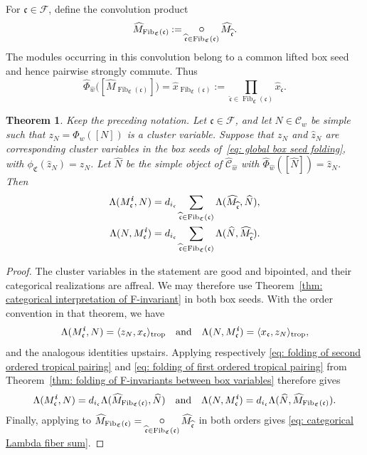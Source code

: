 \documentclass[12pt, leqno]{amsart}
\numberwithin{equation}{section}
\theoremstyle{plain}
\newtheorem{theorem}[lemma]{Theorem}
\theoremstyle{definition}
\newcommand{\seteq}{\mathbin{:=}}
\newcommand{\conv}{\mathop{\mathbin{\mbox{\large $\circ$}}}}
\newcommand{\trop}{{\rm trop}}
\newcommand{\ii}{ \textbf{\textit{i}}}
\newcommand{\Fib}{\operatorname{Fib}}
\newcommand{\hM}{\widehat{M}}
\newcommand{\hN}{\widehat{N}}
\newcommand{\hw}{\widehat{w}}
\newcommand{\hx}{\widehat{x}}
\newcommand{\hz}{\widehat{z}}
\newcommand{\frakC}{\mathfrak{C}}
\newcommand{\frakc}{\mathfrak{c}}
\newcommand{\hfrakc}{\widehat{\frakc}}
\newcommand{\calF}{\mathcal{F}}
\newcommand{\scrC}{\mathscr{C}}
\newcommand{\qtq}[1][{and}]{\quad\text{{#1}}\quad}
\begin{document}
For \(\frakc\in\calF\),   define the convolution product 
\[
\hM_{\Fib_{\frakC}(\frakc)} \seteq \mathop{\conv}_{\hfrakc\in\Fib_{\frakC}(\frakc)} \hM_{\hfrakc}.
\]
The modules occurring in this convolution belong to a common lifted
box seed and hence pairwise strongly commute. 
Thus 
\[
\widehat\Phi_{\hw} \bigl([\hM_{\Fib_{\frakC}(\frakc)}]\bigr) = \hx_{\Fib_{\frakC}(\frakc)} \seteq
\prod_{\hfrakc\in\Fib_{\frakC}(\frakc)} \hx_{\hfrakc}.
\]

\begin{theorem}\label{thm: categorical folding of directional Lambda invariants}
Keep the preceding notation.  Let \(\frakc\in\calF\), and let
\(N\in\scrC_w\) be simple such that \(z_N=\Phi_w([N])\) is a
cluster variable.   Suppose that \(z_N\) and \(\hz_N\) are corresponding cluster variables
in the box seeds of~\eqref{eq: global box seed folding}, with
\(\phi_{\frakC}(\hz_N)=z_N\).  Let \(\hN\) be the simple object of
\(\widehat{\scrC}_{\hw}\) with
\(\widehat\Phi_{\hw}([\hN])=\hz_N\). Then
\begin{subequations} \label{eq: categorical Lambda fiber sum}
\begin{align}
\label{eq: categorical first Lambda fiber sum}
\Lambda(M_\frakc^\ii,N)
&=d_{i_\frakc}\sum_{\hfrakc\in\Fib_{\frakC}(\frakc)}
\Lambda(\hM_{\hfrakc},\hN),\\
\label{eq: categorical second Lambda fiber sum}
\Lambda(N,M_\frakc^\ii)
&=d_{i_\frakc}\sum_{\hfrakc\in\Fib_{\frakC}(\frakc)}
\Lambda(\hN,\hM_{\hfrakc}).
\end{align}
\end{subequations}
\end{theorem}

\begin{proof}
The cluster variables in the statement are good and bipointed, and
their categorical realizations are affreal.  We may therefore use
Theorem~\ref{thm: categorical interpretation of F-invariant} in
both box seeds.  With the order convention in that theorem, we have
\[
 \Lambda(M_\frakc^\ii,N)=\langle z_N,x_\frakc\rangle_{\trop}
 \qtq 
 \Lambda(N,M_\frakc^\ii)=\langle x_\frakc,z_N\rangle_{\trop},
\]
and the analogous identities upstairs.  Applying respectively
\eqref{eq: folding of second ordered tropical pairing} and
\eqref{eq: folding of first ordered tropical pairing} from
Theorem~\ref{thm: folding of F-invariants between box variables}
therefore gives
\[
\begin{aligned}
 \Lambda(M_\frakc^\ii,N)
 =d_{i_\frakc}\Lambda(\hM_{\Fib_{\frakC}(\frakc)},\hN) \qtq
 \Lambda(N,M_\frakc^\ii)
 =d_{i_\frakc}\Lambda(\hN,\hM_{\Fib_{\frakC}(\frakc)}).
\end{aligned}
\]
Finally, applying \cite[Proposition~2.6]{KKOP26}
to \(\hM_{\Fib_{\frakC}(\frakc)}
=\displaystyle\mathop{\conv}_{\hfrakc\in\Fib_{\frakC}(\frakc)}
\hM_{\hfrakc}\) in both orders gives
\eqref{eq: categorical Lambda fiber sum}.  
\end{proof}
\end{document}
